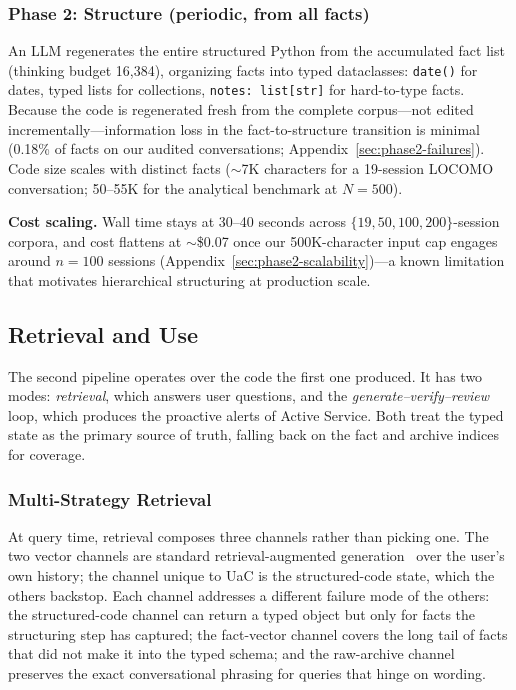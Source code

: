 \subsubsection{Phase 2: Structure (periodic, from all facts)}

An LLM regenerates the entire structured Python from the accumulated fact list (thinking budget 16{,}384), organizing facts into typed dataclasses: \texttt{date()} for dates, typed lists for collections, \texttt{notes: list[str]} for hard-to-type facts. Because the code is regenerated fresh from the complete corpus---not edited incrementally---information loss in the fact-to-structure transition is minimal (0.18\% of facts on our audited conversations; Appendix~\ref{sec:phase2-failures}). Code size scales with distinct facts ($\sim$7K characters for a 19-session LOCOMO conversation; 50--55K for the analytical benchmark at $N{=}500$).

\textbf{Cost scaling.} Wall time stays at 30--40 seconds across $\{19, 50, 100, 200\}$-session corpora, and cost flattens at $\sim$\$0.07 once our 500K-character input cap engages around $n{=}100$ sessions (Appendix~\ref{sec:phase2-scalability})---a known limitation that motivates hierarchical structuring at production scale.

\subsection{Retrieval and Use}
\label{sec:retrieval-use}

The second pipeline operates over the code the first one produced. It has two modes: \emph{retrieval}, which answers user questions, and the \emph{generate--verify--review} loop, which produces the proactive alerts of Active Service. Both treat the typed state as the primary source of truth, falling back on the fact and archive indices for coverage.

\subsubsection{Multi-Strategy Retrieval}
\label{sec:retrieval}

At query time, retrieval composes three channels rather than picking one. The two vector channels are standard retrieval-augmented generation~\citep{lewis2020rag} over the user's own history; the channel unique to UaC is the structured-code state, which the others backstop. Each channel addresses a different failure mode of the others: the structured-code channel can return a typed object but only for facts the structuring step has captured; the fact-vector channel covers the long tail of facts that did not make it into the typed schema; and the raw-archive channel preserves the exact conversational phrasing for queries that hinge on wording.

